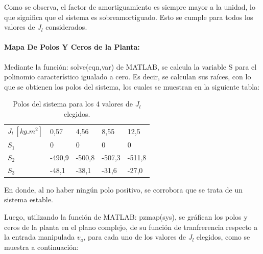 \documentclass{article}
\begin{document}
\begin{sloppypar}
Como se observa, el factor de amortiguamiento es siempre mayor a la unidad, lo que significa que el sistema es sobreamortiguado. Esto se cumple para todos los valores de $J_l$ considerados.


\paragraph{Mapa De Polos Y Ceros de la Planta:}
\label{sec:Mapa De Polos Y Ceros de la Planta:}
\hfill

\hfill

Mediante la función: solve(eqn,var) de MATLAB, se calcula la variable S para el polinomio característico igualado a cero. Es decir, se calculan sus raíces, con lo que se obtienen los polos del sistema, los cuales se muestran en la siguiente tabla:

\begin{table}[H]
    \centering
    \begin{tabular}{|l|llll|}
    \cline{1-5}
    \textbf{$J_l ~[kg.m^2]$}    &    0,57 &    4,56 &    8,55  &   12,5  \\ \cline{1-5}
    \textbf{$S_1$}              &    0    &    0    &    0     &    0    \\ \cline{1-5}
    \textbf{$S_2$}              & -490,9  & -500,8  & -507,3   & -511,8  \\ \cline{1-5}
    \textbf{$S_3$}              &  -48,1  &  -38,1  &  -31,6   &  -27,0  \\ \cline{1-5}
    \end{tabular}
    \caption{\label{table:Polos del sistema para los 4 valores de Jl elegidos}Polos del sistema para los 4 valores de $J_l$ elegidos.}
\end{table}

En donde, al no haber ningún polo positivo, se corrobora que se trata de un sistema estable.

Luego, utilizando la función de MATLAB: pzmap(sys), se gráfican los polos y ceros de la planta en el plano complejo, de su función de tranfrerencia respecto a la entrada manipulada $v_a$, para cada uno de los valores de $J_l$ elegidos, como se muestra a continuación:


\end{sloppypar}
\end{document}
